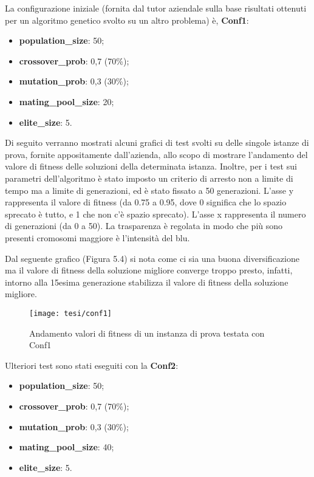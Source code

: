 \noindent La configurazione iniziale (fornita dal tutor aziendale sulla base risultati ottenuti per un algoritmo genetico svolto su un altro problema) è, \textbf{Conf1}:
\begin{itemize}
	\item\textbf{population\_size}: 50;
	\item\textbf{crossover\_prob}: 0,7 (70\%);
	\item\textbf{mutation\_prob}: 0,3 (30\%);
	\item\textbf{mating\_pool\_size}: 20;
	\item\textbf{elite\_size}: 5.
\end{itemize}

Di seguito verranno mostrati alcuni grafici di test svolti su delle singole istanze di prova, fornite appositamente dall'azienda, allo scopo di mostrare l'andamento del valore di fitness delle soluzioni della determinata istanza. Inoltre, per i test sui parametri dell'algoritmo è stato imposto un criterio di arresto non a limite di tempo ma a limite di generazioni, ed è stato fissato a 50 generazioni. 
L'asse y rappresenta il valore di fitness (da 0.75 a 0.95, dove 0 significa che lo spazio sprecato è tutto, e 1 che non c'è spazio sprecato). L'asse x rappresenta il numero di generazioni (da 0 a 50).
La trasparenza è regolata in modo che più sono presenti cromosomi maggiore è l'intensità del blu.

Dal seguente grafico (Figura 5.4) si nota come ci sia una buona diversificazione ma il valore di fitness della soluzione migliore converge troppo presto, infatti, intorno alla 15esima generazione stabilizza il valore di fitness della soluzione migliore. 

\begin{figure}[!ht] 
    \centering 
    \texttt{[image: tesi/conf1]} 
    \caption{Andamento valori di fitness di un instanza di prova testata con Conf1}
\end{figure}

Ulteriori test sono stati eseguiti con la \textbf{Conf2}:
\begin{itemize}
	\item\textbf{population\_size}: 50;
	\item\textbf{crossover\_prob}: 0,7 (70\%);
	\item\textbf{mutation\_prob}: 0,3 (30\%);
	\item\textbf{mating\_pool\_size}: 40;
	\item\textbf{elite\_size}: 5.
\end{itemize}

